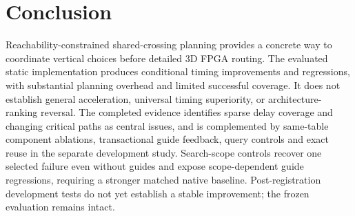 \documentclass[conference,10pt]{IEEEtran}
\begin{document}
\section{Conclusion}
Reachability-constrained shared-crossing planning provides a concrete way to coordinate vertical choices before detailed 3D FPGA routing. The evaluated static implementation produces conditional timing improvements and regressions, with substantial planning overhead and limited successful coverage. It does not establish general acceleration, universal timing superiority, or architecture-ranking reversal. The completed evidence identifies sparse delay coverage and changing critical paths as central issues, and is complemented by same-table component ablations, transactional guide feedback, query controls and exact reuse in the separate development study. Search-scope controls recover one selected failure even without guides and expose scope-dependent guide regressions, requiring a stronger matched native baseline. Post-registration development tests do not yet establish a stable improvement; the frozen evaluation remains intact.

\clearpage


\end{document}
